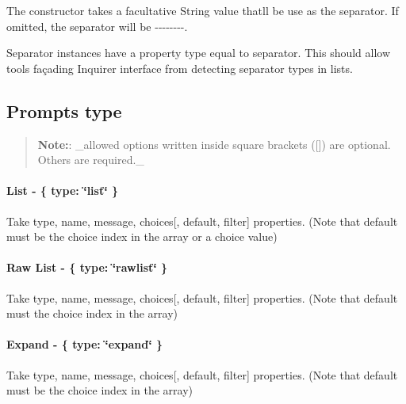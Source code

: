 The constructor takes a facultative {\ttfamily String} value that\textquotesingle{}ll be use as the separator. If omitted, the separator will be {\ttfamily -\/-\/-\/-\/-\/-\/-\/-\/}.

Separator instances have a property {\ttfamily type} equal to {\ttfamily separator}. This should allow tools façading Inquirer interface from detecting separator types in lists.

\subsection*{Prompts type }

\begin{quote}
{\bfseries Note\+:}\+: \+\_\+allowed options written inside square brackets ({\ttfamily \mbox{[}\mbox{]}}) are optional. Others are required.\+\_\+ \end{quote}


\paragraph*{List -\/ {\ttfamily \{ type\+: \char`\"{}list\char`\"{} \}}}

Take {\ttfamily type}, {\ttfamily name}, {\ttfamily message}, {\ttfamily choices}\mbox{[}, {\ttfamily default}, {\ttfamily filter}\mbox{]} properties. (Note that default must be the choice {\ttfamily index} in the array or a choice {\ttfamily value})

 



\paragraph*{Raw List -\/ {\ttfamily \{ type\+: \char`\"{}rawlist\char`\"{} \}}}

Take {\ttfamily type}, {\ttfamily name}, {\ttfamily message}, {\ttfamily choices}\mbox{[}, {\ttfamily default}, {\ttfamily filter}\mbox{]} properties. (Note that default must the choice {\ttfamily index} in the array)

 



\paragraph*{Expand -\/ {\ttfamily \{ type\+: \char`\"{}expand\char`\"{} \}}}

Take {\ttfamily type}, {\ttfamily name}, {\ttfamily message}, {\ttfamily choices}\mbox{[}, {\ttfamily default}, {\ttfamily filter}\mbox{]} properties. (Note that default must be the choice {\ttfamily index} in the array)

